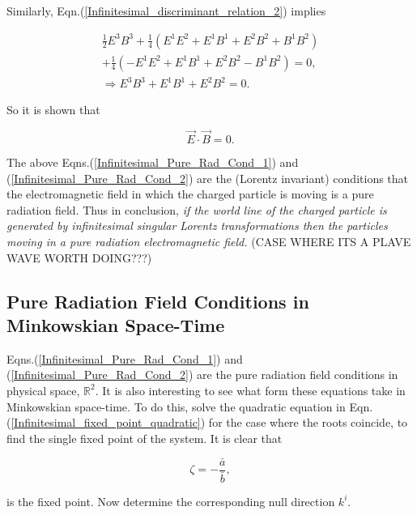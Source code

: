 \noindent Similarly, Eqn.(\ref{Infinitesimal_discriminant_relation_2}) implies

\begin{eqnarray*}
\frac{1}{2} E^3 B^3 + \frac{1}{4} (E^1E^2 + E^1B^1 + E^2B^2 + B^1B^2) \\
 +  \frac{1}{4} (-E^1E^2 + E^1B^1 + E^2B^2 - B^1B^2) = 0, \\
\Rightarrow E^3B^3 + E^1B^1 + E^2B^2 = 0.
\end{eqnarray*}

\noindent So it is shown that

\begin{equation}\label{Infinitesimal_Pure_Rad_Cond_2}
\vec{E} \cdot \vec{B} = 0.
\end{equation}

\noindent The above Eqns.(\ref{Infinitesimal_Pure_Rad_Cond_1}) and (\ref{Infinitesimal_Pure_Rad_Cond_2}) are the (Lorentz invariant) conditions that the electromagnetic field in which the charged particle is moving is a pure radiation field. Thus in conclusion, \textit{if the world line of the charged particle is generated by infinitesimal singular Lorentz transformations then the particles moving in a pure radiation electromagnetic field.} (CASE WHERE ITS A PLAVE WAVE WORTH DOING???)

\subsection{Pure Radiation Field Conditions in Minkowskian Space-Time}

Eqns.(\ref{Infinitesimal_Pure_Rad_Cond_1}) and (\ref{Infinitesimal_Pure_Rad_Cond_2}) are the pure radiation field conditions in physical space, ${\mathbb{R}}^2$. It is also interesting to see what form these equations take in Minkowskian space-time. To do this, solve the quadratic equation in Eqn.(\ref{Infinitesimal_fixed_point_quadratic}) for the case where the roots coincide, to find the single fixed point of the system. It is clear that 

\begin{equation*}
\zeta = - \frac{\bar{a}}{\bar{b}},
\end{equation*}

\noindent is the fixed point. Now determine the corresponding null direction $k^i$. 










